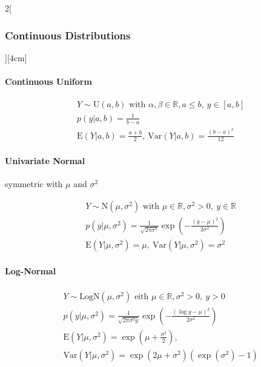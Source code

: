 \documentclass[8pt]{extarticle}
\begin{document}
\begin{multicols}{2}[\subsubsection{Continuous Distributions}][4cm]

	\paragraph{Continuous Uniform}
  
    \begin{align*}
    & Y \sim \mathrm{U}(a,b) \text{ with } \alpha, \beta \in \mathbb{R}, a \le b,\: y \in \left[a,b\right] \\
    & p(y|a,b) =\frac{1}{b-a} \\
    & \mathrm{E}(Y|a,b) = \frac{a+b}{2} ,\: \mathrm{Var}(Y|a,b) = \frac{(b-a)^2}{12}
  \end{align*}
  
    \paragraph{Univariate Normal} symmetric with $\mu$ and $\sigma^2$
  
    \begin{align*}
    & Y \sim \mathrm{N}(\mu, \sigma^2) \text{ with } \mu \in \mathbb{R}, \sigma^2 > 0,\: y \in \mathbb{R} \\
    & p(y|\mu, \sigma^2) =\frac{1}{\sqrt{2\pi\sigma^2}} \exp \left(-\frac{(y-\mu)^2}{2 \sigma^2} \right) \\
    & \mathrm{E}(Y|\mu, \sigma^2) = \mu ,\: \mathrm{Var}(Y|\mu, \sigma^2) = \sigma^2
  \end{align*}
  
  
    \paragraph{Log-Normal}
  
    \begin{align*}
    & Y \sim \mathrm{LogN}(\mu, \sigma^2) \text{ eith } \mu \in \mathbb{R}, \sigma^2 > 0,\: y > 0 \\
    & p(y|\mu, \sigma^2) =\frac{1}{\sqrt{2\pi\sigma^2 y}} \exp \left(-\frac{(\log y-\mu)^2}{2 \sigma^2} \right) \\
    & \mathrm{E}(Y|\mu, \sigma^2) = \exp (\mu + \frac{\sigma^2}{2}) ,\\
    & \mathrm{Var}(Y|\mu, \sigma^2) = \exp (2\mu + \sigma^2)(\exp (\sigma^2) - 1)
  \end{align*}
  

\end{multicols}
\end{document}
